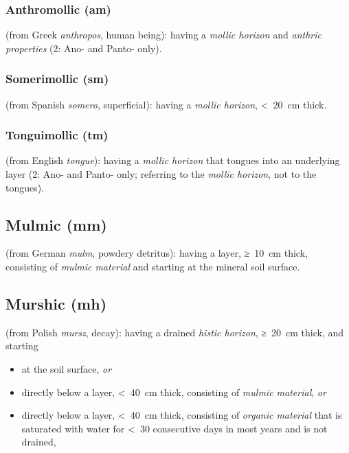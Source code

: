 \documentclass[
  letterpaper,
  DIV=11,
  numbers=noendperiod]{scrreprt}
\providecommand{\tightlist}{%
  \setlength{\itemsep}{0pt}\setlength{\parskip}{0pt}}\usepackage{longtable,booktabs,array}
\begin{document}
\hypertarget{anthromollic-am}{%
\subsubsection{Anthromollic (am)}\label{anthromollic-am}}

(from Greek \emph{anthropos}, human being): having a \emph{mollic
horizon} and \emph{anthric properties} (2: Ano- and Panto- only).

\hypertarget{somerimollic-sm}{%
\subsubsection{Somerimollic (sm)}\label{somerimollic-sm}}

(from Spanish \emph{somero}, superficial): having a \emph{mollic
horizon}, \textless~20~cm thick.

\hypertarget{tonguimollic-tm}{%
\subsubsection{Tonguimollic (tm)}\label{tonguimollic-tm}}

(from English \emph{tongue}): having a \emph{mollic horizon} that
tongues into an underlying layer (2: Ano- and Panto- only; referring to
the \emph{mollic horizon}, not to the tongues).

\hypertarget{mulmic-mm}{%
\subsection{Mulmic (mm)}\label{mulmic-mm}}

(from German \emph{mulm}, powdery detritus): having a layer, ≥~10~cm
thick, consisting of \emph{mulmic material} and starting at the mineral
soil surface.

\hypertarget{murshic-mh}{%
\subsection{Murshic (mh)}\label{murshic-mh}}

(from Polish \emph{mursz}, decay): having a drained \emph{histic
horizon}, ≥~20~cm thick, and starting

\begin{itemize}
\tightlist
\item
  at the soil surface, \emph{or}
\item
  directly below a layer, \textless~40~cm thick, consisting of
  \emph{mulmic material}, \emph{or}
\item
  directly below a layer, \textless~40~cm thick, consisting of
  \emph{organic material} that is saturated with water for \textless~30
  consecutive days in most years and is not drained,
\end{itemize}
\end{document}

